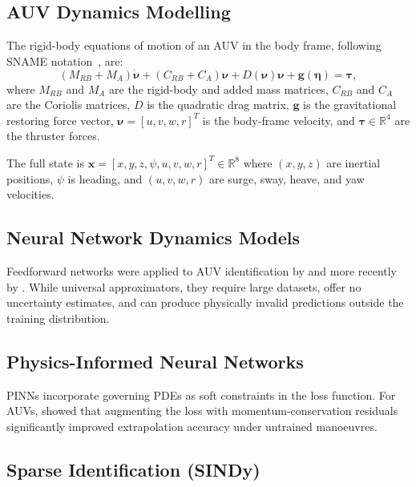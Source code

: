 \documentclass[conference]{IEEEtran}
\newcommand{\vx}{\mathbf{x}}
\newcommand{\Rn}[1]{\mathbb{R}^{#1}}
\begin{document}
\subsection{AUV Dynamics Modelling}

The rigid-body equations of motion of an AUV in the body frame,
following SNAME notation~\cite{Fossen2011}, are:
\begin{equation}
  (M_{RB} + M_A)\dot{\boldsymbol{\nu}} + (C_{RB} + C_A)\boldsymbol{\nu}
  + D(\boldsymbol{\nu})\boldsymbol{\nu} + \mathbf{g}(\boldsymbol{\eta}) = \boldsymbol{\tau},
  \label{eq:auv_dynamics}
\end{equation}
where $M_{RB}$ and $M_A$ are the rigid-body and added mass matrices,
$C_{RB}$ and $C_A$ are the Coriolis matrices, $D$ is the quadratic
drag matrix, $\mathbf{g}$ is the gravitational restoring force vector,
$\boldsymbol{\nu} = [u,v,w,r]^T$ is the body-frame velocity, and
$\boldsymbol{\tau} \in \Rn{4}$ are the thruster forces.

The full state is $\vx = [x, y, z, \psi, u, v, w, r]^T \in \Rn{8}$ where
$(x,y,z)$ are inertial positions, $\psi$ is heading, and $(u,v,w,r)$ are
surge, sway, heave, and yaw velocities.

\subsection{Neural Network Dynamics Models}

Feedforward networks were applied to AUV identification by \cite{Zhu2020DNNAUV}
and more recently by \cite{Carlucho2018IL}. While universal approximators,
they require large datasets, offer no uncertainty estimates, and can produce
physically invalid predictions outside the training distribution.

\subsection{Physics-Informed Neural Networks}

PINNs \cite{Raissi2019PINN} incorporate governing PDEs as soft constraints
in the loss function. For AUVs, \cite{Wang2022PINNAUV} showed that augmenting
the loss with momentum-conservation residuals significantly improved
extrapolation accuracy under untrained manoeuvres.

\subsection{Sparse Identification (SINDy)}
\end{document}
